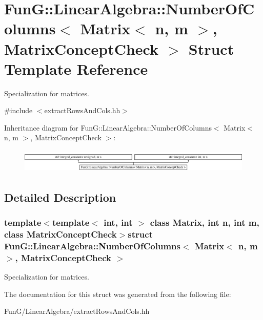 \hypertarget{structFunG_1_1LinearAlgebra_1_1NumberOfColumns_3_01Matrix_3_01n_00_01m_01_4_00_01MatrixConceptCheck_01_4}{\section{Fun\-G\-:\-:Linear\-Algebra\-:\-:Number\-Of\-Columns$<$ Matrix$<$ n, m $>$, Matrix\-Concept\-Check $>$ Struct Template Reference}
\label{structFunG_1_1LinearAlgebra_1_1NumberOfColumns_3_01Matrix_3_01n_00_01m_01_4_00_01MatrixConceptCheck_01_4}
}


Specialization for matrices.  




{\ttfamily \#include $<$extract\-Rows\-And\-Cols.\-hh$>$}

Inheritance diagram for Fun\-G\-:\-:Linear\-Algebra\-:\-:Number\-Of\-Columns$<$ Matrix$<$ n, m $>$, Matrix\-Concept\-Check $>$\-:\begin{figure}[H]
\begin{center}
\leavevmode
\includegraphics[height=1.154639cm]{structFunG_1_1LinearAlgebra_1_1NumberOfColumns_3_01Matrix_3_01n_00_01m_01_4_00_01MatrixConceptCheck_01_4}
\end{center}
\end{figure}


\subsection{Detailed Description}
\subsubsection*{template$<$template$<$ int, int $>$ class Matrix, int n, int m, class Matrix\-Concept\-Check$>$struct Fun\-G\-::\-Linear\-Algebra\-::\-Number\-Of\-Columns$<$ Matrix$<$ n, m $>$, Matrix\-Concept\-Check $>$}

Specialization for matrices. 

The documentation for this struct was generated from the following file\-:\begin{DoxyCompactItemize}
\item 
Fun\-G/\-Linear\-Algebra/extract\-Rows\-And\-Cols.\-hh\end{DoxyCompactItemize}
